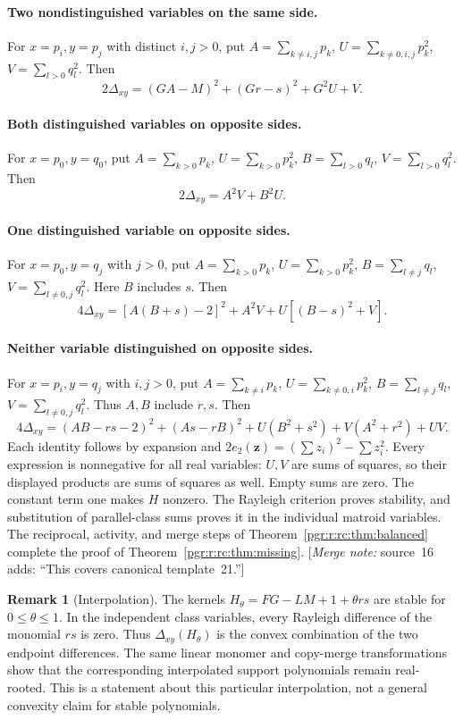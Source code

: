 \documentclass[11pt]{article}
\numberwithin{equation}{section}
\theoremstyle{definition}\newtheorem{definition}[theorem]{Definition}\newtheorem{remark}[theorem]{Remark}
\newcommand{\mnote}[1]{[\textit{Merge note:} #1]}
\begin{document}
\paragraph{Two nondistinguished variables on the same side.}
For $x=p_i,y=p_j$ with distinct $i,j>0$, put
$A=\sum_{k\ne i,j}p_k$, $U=\sum_{k\ne0,i,j}p_k^2$,
$V=\sum_{l>0}q_l^2$. Then
\[
 2\Delta_{xy}=(GA-M)^2+(Gr-s)^2+G^2U+V.
\]
\paragraph{Both distinguished variables on opposite sides.}
For $x=p_0,y=q_0$, put
$A=\sum_{k>0}p_k$, $U=\sum_{k>0}p_k^2$,
$B=\sum_{l>0}q_l$, $V=\sum_{l>0}q_l^2$. Then
\[
 2\Delta_{xy}=A^2V+B^2U.
\]
\paragraph{One distinguished variable on opposite sides.}
For $x=p_0,y=q_j$ with $j>0$, put
$A=\sum_{k>0}p_k$, $U=\sum_{k>0}p_k^2$,
$B=\sum_{l\ne j}q_l$, $V=\sum_{l\ne0,j}q_l^2$. Here $B$ includes $s$. Then
\[
 4\Delta_{xy}=[A(B+s)-2]^2+A^2V+U[(B-s)^2+V].
\]
\paragraph{Neither variable distinguished on opposite sides.}
For $x=p_i,y=q_j$ with $i,j>0$, put
$A=\sum_{k\ne i}p_k$, $U=\sum_{k\ne0,i}p_k^2$,
$B=\sum_{l\ne j}q_l$, $V=\sum_{l\ne0,j}q_l^2$. Thus $A,B$ include $r,s$. Then
\[
 4\Delta_{xy}=(AB-rs-2)^2+(As-rB)^2
             +U(B^2+s^2)+V(A^2+r^2)+UV.
\]
Each identity follows by expansion and
$2e_2(\mathbf z)=(\sum z_i)^2-\sum z_i^2$.
Every expression is nonnegative for all real variables: $U,V$ are sums of squares, so their displayed products are sums of squares as well. Empty sums are zero. The constant term one makes $H$ nonzero. The Rayleigh criterion proves stability, and substitution of parallel-class sums proves it in the individual matroid variables. The reciprocal, activity, and merge steps of Theorem~\ref{pgr:r:rc:thm:balanced} complete the proof of Theorem~\ref{pgr:r:rc:thm:missing}.
\mnote{source~16 adds: ``This covers canonical template~21.''}

\begin{remark}[Interpolation]
The kernels $H_\theta=FG-LM+1+\theta rs$ are stable for $0\le\theta\le1$. In the independent class variables, every Rayleigh difference of the monomial $rs$ is zero. Thus $\Delta_{xy}(H_\theta)$ is the convex combination of the two endpoint differences. The same linear monomer and copy-merge transformations show that the corresponding interpolated support polynomials remain real-rooted. This is a statement about this particular interpolation, not a general convexity claim for stable polynomials.
\end{remark}
\end{document}
